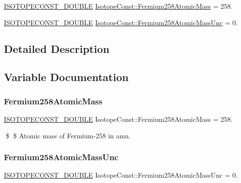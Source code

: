 \begin{DoxyCompactItemize}
\item 
\mbox{\hyperlink{group___isotope_const-_macros_ga8f45a7272ce02c0b4c65c44636ed719a}{I\+S\+O\+T\+O\+P\+E\+C\+O\+N\+S\+T\+\_\+\+D\+O\+U\+B\+LE}} \mbox{\hyperlink{group___isotope_const-_fermium-_fm258_ga183c703286a7ee3a245f4431e30486ef}{Isotope\+Const\+::\+Fermium258\+Atomic\+Mass}} = 258.
\item 
\mbox{\hyperlink{group___isotope_const-_macros_ga8f45a7272ce02c0b4c65c44636ed719a}{I\+S\+O\+T\+O\+P\+E\+C\+O\+N\+S\+T\+\_\+\+D\+O\+U\+B\+LE}} \mbox{\hyperlink{group___isotope_const-_fermium-_fm258_ga08ec9462de01a6505854337dfa971033}{Isotope\+Const\+::\+Fermium258\+Atomic\+Mass\+Unc}} = 0.
\end{DoxyCompactItemize}


\subsection{Detailed Description}


\subsection{Variable Documentation}
\mbox{\label{group___isotope_const-_fermium-_fm258_ga183c703286a7ee3a245f4431e30486ef}} 
\subsubsection{\texorpdfstring{Fermium258\+Atomic\+Mass}{Fermium258AtomicMass}}
{\footnotesize\ttfamily \mbox{\hyperlink{group___isotope_const-_macros_ga8f45a7272ce02c0b4c65c44636ed719a}{I\+S\+O\+T\+O\+P\+E\+C\+O\+N\+S\+T\+\_\+\+D\+O\+U\+B\+LE}} Isotope\+Const\+::\+Fermium258\+Atomic\+Mass = 258.}

\$ \$ Atomic mass of Fermium-\/258 in amu. \mbox{\label{group___isotope_const-_fermium-_fm258_ga08ec9462de01a6505854337dfa971033}} 
\subsubsection{\texorpdfstring{Fermium258\+Atomic\+Mass\+Unc}{Fermium258AtomicMassUnc}}
{\footnotesize\ttfamily \mbox{\hyperlink{group___isotope_const-_macros_ga8f45a7272ce02c0b4c65c44636ed719a}{I\+S\+O\+T\+O\+P\+E\+C\+O\+N\+S\+T\+\_\+\+D\+O\+U\+B\+LE}} Isotope\+Const\+::\+Fermium258\+Atomic\+Mass\+Unc = 0.}


